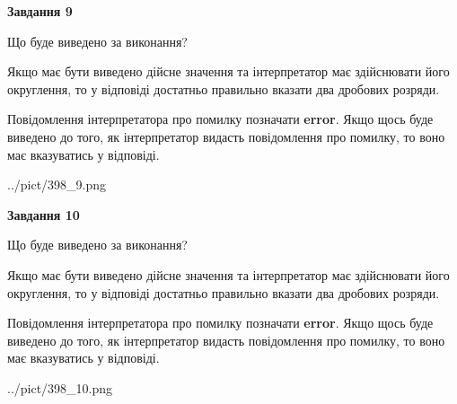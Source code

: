 \documentclass[12pt, ukrainian]{article}
\begin{document}
{\begin {Large}
{\begin {center}\textbf{Завдання 9}\end {center}}\par
Що буде виведено за виконання? \par

Якщо має бути виведено дійсне значення та інтерпретатор має здійснювати його округлення, 
то у відповіді достатньо правильно вказати два дробових розряди.

Повідомлення інтерпретатора про помилку позначати \textbf{error}.
Якщо щось буде виведено до того, як інтерпретатор видасть повідомлення про помилку, 
то воно має вказуватись у відповіді. \par

\begin{center}
	{../pict/398_9.png}
\end{center}
\newpage

{\begin {center}\textbf{Завдання 10}\end {center}}\par
Що буде виведено за виконання? \par

Якщо має бути виведено дійсне значення та інтерпретатор має здійснювати його округлення, 
то у відповіді достатньо правильно вказати два дробових розряди.

Повідомлення інтерпретатора про помилку позначати \textbf{error}.
Якщо щось буде виведено до того, як інтерпретатор видасть повідомлення про помилку, 
то воно має вказуватись у відповіді. \par

\begin{center}
	{../pict/398_10.png}
\end{center}
\newpage

\end {Large}}
\end{document}
